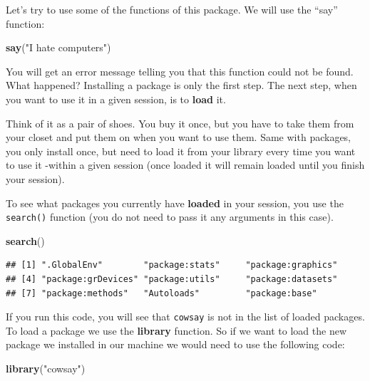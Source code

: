 \documentclass[]{book}
\newenvironment{Shaded}{\begin{snugshade}}{\end{snugshade}}
\newcommand{\KeywordTok}[1]{\textcolor[rgb]{0.13,0.29,0.53}{\textbf{#1}}}
\newcommand{\NormalTok}[1]{#1}
\newcommand{\StringTok}[1]{\textcolor[rgb]{0.31,0.60,0.02}{#1}}
\theoremstyle{definition}
\theoremstyle{definition}
\theoremstyle{definition}
\theoremstyle{remark}
\begin{document}
Let's try to use some of the functions of this package. We will use the
``say'' function:

\begin{Shaded}
\begin{Highlighting}[]
\KeywordTok{say}\NormalTok{(}\StringTok{"I hate computers"}\NormalTok{)}
\end{Highlighting}
\end{Shaded}

You will get an error message telling you that this function could not
be found. What happened? Installing a package is only the first step.
The next step, when you want to use it in a given session, is to
\textbf{load} it.

Think of it as a pair of shoes. You buy it once, but you have to take
them from your closet and put them on when you want to use them. Same
with packages, you only install once, but need to load it from your
library every time you want to use it -within a given session (once
loaded it will remain loaded until you finish your session).

To see what packages you currently have \textbf{loaded} in your session,
you use the \texttt{search()} function (you do not need to pass it any
arguments in this case).

\begin{Shaded}
\begin{Highlighting}[]
\KeywordTok{search}\NormalTok{()}
\end{Highlighting}
\end{Shaded}

\begin{verbatim}
## [1] ".GlobalEnv"        "package:stats"     "package:graphics" 
## [4] "package:grDevices" "package:utils"     "package:datasets" 
## [7] "package:methods"   "Autoloads"         "package:base"
\end{verbatim}

If you run this code, you will see that \texttt{cowsay} is not in the
list of loaded packages. To load a package we use the \textbf{library}
function. So if we want to load the new package we installed in our
machine we would need to use the following code:

\begin{Shaded}
\begin{Highlighting}[]
\KeywordTok{library}\NormalTok{(}\StringTok{"cowsay"}\NormalTok{)}
\end{Highlighting}
\end{Shaded}
\end{document}
